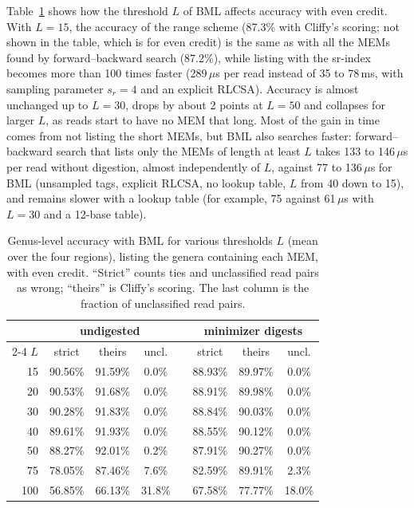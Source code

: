Table~\ref{tab:L} shows how the threshold $L$ of BML affects accuracy with even credit.
With $L = 15$, the accuracy of the range scheme (87.3\% with Cliffy's scoring; not shown in the table, which is for even credit) is the same as with all the MEMs found by forward--backward search (87.2\%), while listing with the sr-index becomes more than 100 times faster (289\,$\mu$s per read instead of 35 to 78\,ms, with sampling parameter $s_r = 4$ and an explicit RLCSA).
Accuracy is almost unchanged up to $L = 30$, drops by about 2 points at $L = 50$ and collapses for larger $L$, as reads start to have no MEM that long.
Most of the gain in time comes from not listing the short MEMs, but BML also searches faster: forward--backward search that lists only the MEMs of length at least $L$ takes 133 to 146\,$\mu$s per read without digestion, almost independently of $L$, against 77 to 136\,$\mu$s for BML (unsampled tags, explicit RLCSA, no lookup table, $L$ from 40 down to 15), and remains slower with a lookup table (for example, 75 against 61\,$\mu$s with $L = 30$ and a 12-base table).

\begin{table}[t]
\centering
\caption{Genus-level accuracy with BML for various thresholds $L$ (mean over the four regions), listing the genera containing each MEM, with even credit.
``Strict'' counts ties and unclassified read pairs as wrong; ``theirs'' is Cliffy's scoring.
The last column is the fraction of unclassified read pairs.}
\label{tab:L}
\begin{tabular}{rccccccc}
\toprule
 & \multicolumn{3}{c}{undigested} & & \multicolumn{3}{c}{minimizer digests} \\
\cmidrule{2-4} \cmidrule{6-8}
$L$ & strict & theirs & uncl. & & strict & theirs & uncl. \\
\midrule
15 & 90.56\% & 91.59\% & 0.0\% & & 88.93\% & 89.97\% & 0.0\% \\
20 & 90.53\% & 91.68\% & 0.0\% & & 88.91\% & 89.98\% & 0.0\% \\
30 & 90.28\% & 91.83\% & 0.0\% & & 88.84\% & 90.03\% & 0.0\% \\
40 & 89.61\% & 91.93\% & 0.0\% & & 88.55\% & 90.12\% & 0.0\% \\
50 & 88.27\% & 92.01\% & 0.2\% & & 87.91\% & 90.27\% & 0.0\% \\
75 & 78.05\% & 87.46\% & 7.6\% & & 82.59\% & 89.91\% & 2.3\% \\
100 & 56.85\% & 66.13\% & 31.8\% & & 67.58\% & 77.77\% & 18.0\% \\
\bottomrule
\end{tabular}
\end{table}

